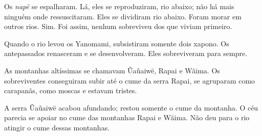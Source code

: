 Os \emph{napë} se espalharam. Lá, eles se reproduziram, rio abaixo; não
há mais ninguém onde ressuscitaram. Eles se dividiram rio abaixo. Foram
morar em outros rios. Sim. Foi assim, nenhum sobreviveu dos que viviam
primeiro. 

Quando o rio levou os Yanomami, subsistiram somente dois xapono. Os
antepassados renasceram e se desenvolveram. Eles sobreviveram para
sempre. 

As montanhas altíssimas se chamavam Ũaũaiwë, Rapai e Wãima. Os
sobreviventes conseguiram subir até o cume da serra Rapai, se agruparam
como carapanãs, como moscas e estavam tristes. 

A serra Ũaũaiwë acabou afundando; restou somente o cume da montanha. O céu parecia se apoiar no cume das montanhas Rapai e Wãima. Não deu para
o rio atingir o cume dessas montanhas. 
